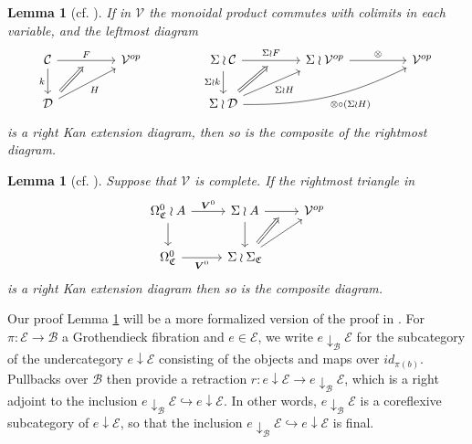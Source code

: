 \documentclass[a4paper,10pt
]{article}%
\numberwithin{equation}{section}
\numberwithin{figure}{section}
\newtheorem{lemma}[equation]{Lemma}%
\theoremstyle{definition} %
\newcommand{\1}{\ensuremath{\mathbbm 1}}%
\begin{document}
\begin{lemma}[{cf. \cite[Lemma 2.21]{BP21}}]
	\label{FINWRPRODLIM LEM}
	If in $\mathcal{V}$ the monoidal product %
	commutes with colimits in each variable, and the leftmost diagram
	\begin{equation}\label{WRLAN EQ}
	\begin{tikzcd}[column sep = 4.5em]
	\mathcal{C} \ar{r}[swap,name=F]{}{F} \ar{d}[swap]{k} & 
	\mathcal{V}^{op} 
& 
	\Sigma \wr \mathcal{C} \ar{d}[swap]{\Sigma \wr k} 
	\ar{r}[swap,name=FF]{}{\Sigma \wr F} & 
	\Sigma \wr \mathcal{V}^{op} \ar{r}{\otimes} &
	\mathcal{V}^{op}
\\
	|[alias=D]|\mathcal{D} \ar{ru}[swap]{H} &
& 
	|[alias=FD]|\Sigma \wr \mathcal{D}
	\ar{ru}[swap]{\Sigma \wr H}
	\ar[bend right=13]{rru}[swap]{\otimes \circ (\Sigma \wr H)}
	&
	\arrow[Rightarrow, from=D, to=F,shorten <=0.10cm]%
	\arrow[Rightarrow, from=FD, to=FF,shorten <=0.10cm]
	\end{tikzcd}
	\end{equation}
	is a right Kan extension diagram,
	then so is the composite of the rightmost diagram. 
\end{lemma}




\begin{lemma}[{cf. \cite[Lemma 4.27]{BP21}}]
	\label{LANPULLCOMA LEM}
	Suppose that $\mathcal{V}$ is complete. If the rightmost triangle in 
	\[
	\begin{tikzcd}
	\Omega_{\mathfrak{C}}^{0} \wr A \ar{r}{\boldsymbol{V}^0} 
	\ar{d} & 
	\Sigma \wr A  
	\ar{d}  \ar{r}[swap,name=F]{}&
	\mathcal{V}^{op}
	\\
	\Omega_{\mathfrak{C}}^{0} \ar{r}[swap]{\boldsymbol{V}^0} & 
	|[alias=FEG]|\Sigma \wr \Sigma_{\mathfrak{C}} \ar{ru}
	\arrow[Rightarrow, from=FEG, to=F,shorten <=0.15cm]
	\end{tikzcd}
	\]
	is a right Kan extension diagram then so is the composite diagram.
\end{lemma}



Our proof Lemma \ref{LANPULLCOMA LEM} will be a more formalized version of the proof in \cite[Lemma 4.27]{BP21}.
For 
$\pi \colon \mathcal{E} \to \mathcal{B}$
a Grothendieck fibration and $e \in \mathcal{E}$,
we write $e \downarrow_{\mathcal{B}} \mathcal{E}$
for the subcategory of the undercategory
$e \downarrow \mathcal{E}$
consisting of the objects and maps
over $id_{\pi(b)}$.
Pullbacks over $\mathcal{B}$ 
then provide a retraction 
$r \colon e \downarrow \mathcal{E} \to
e \downarrow_{\mathcal{B}} \mathcal{E}$,
which is a right adjoint to the inclusion
$e \downarrow_{\mathcal{B}} \mathcal{E} 
\hookrightarrow
e \downarrow \mathcal{E}$.
In other words, 
$e \downarrow_{\mathcal{B}} \mathcal{E} $
is a coreflexive subcategory of 
$e \downarrow \mathcal{E} $,
so that the inclusion
$e \downarrow_{\mathcal{B}} \mathcal{E} 
\hookrightarrow
e \downarrow \mathcal{E}$
is final.
\end{document}
